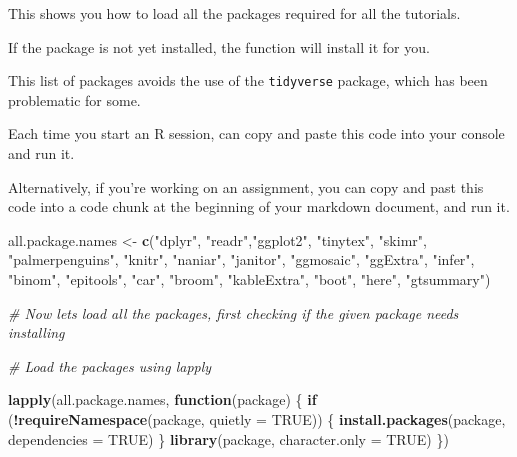 \documentclass[
]{book}
\newenvironment{Shaded}{\begin{snugshade}}{\end{snugshade}}
\newcommand{\AttributeTok}[1]{\textcolor[rgb]{0.13,0.29,0.53}{#1}}
\newcommand{\CommentTok}[1]{\textcolor[rgb]{0.56,0.35,0.01}{\textit{#1}}}
\newcommand{\ConstantTok}[1]{\textcolor[rgb]{0.56,0.35,0.01}{#1}}
\newcommand{\ControlFlowTok}[1]{\textcolor[rgb]{0.13,0.29,0.53}{\textbf{#1}}}
\newcommand{\FunctionTok}[1]{\textcolor[rgb]{0.13,0.29,0.53}{\textbf{#1}}}
\newcommand{\NormalTok}[1]{#1}
\newcommand{\OtherTok}[1]{\textcolor[rgb]{0.56,0.35,0.01}{#1}}
\newcommand{\SpecialCharTok}[1]{\textcolor[rgb]{0.81,0.36,0.00}{\textbf{#1}}}
\newcommand{\StringTok}[1]{\textcolor[rgb]{0.31,0.60,0.02}{#1}}
\begin{document}
This shows you how to load all the packages required for all the tutorials.

If the package is not yet installed, the function will install it for you.

This list of packages avoids the use of the \texttt{tidyverse} package, which has been problematic for some.

Each time you start an R session, can copy and paste this code into your console and run it.

Alternatively, if you're working on an assignment, you can copy and past this code into a code chunk at the beginning of your markdown document, and run it.

\begin{Shaded}
\begin{Highlighting}[]
\NormalTok{all.package.names }\OtherTok{\textless{}{-}} \FunctionTok{c}\NormalTok{(}\StringTok{"dplyr"}\NormalTok{, }\StringTok{"readr"}\NormalTok{,}\StringTok{"ggplot2"}\NormalTok{, }\StringTok{"tinytex"}\NormalTok{, }\StringTok{"skimr"}\NormalTok{, }\StringTok{"palmerpenguins"}\NormalTok{, }\StringTok{"knitr"}\NormalTok{, }\StringTok{"naniar"}\NormalTok{, }\StringTok{"janitor"}\NormalTok{, }\StringTok{"ggmosaic"}\NormalTok{, }\StringTok{"ggExtra"}\NormalTok{, }\StringTok{"infer"}\NormalTok{, }\StringTok{"binom"}\NormalTok{, }\StringTok{"epitools"}\NormalTok{, }\StringTok{"car"}\NormalTok{, }\StringTok{"broom"}\NormalTok{, }\StringTok{"kableExtra"}\NormalTok{, }\StringTok{"boot"}\NormalTok{, }\StringTok{"here"}\NormalTok{, }\StringTok{"gtsummary"}\NormalTok{)}

\CommentTok{\# Now let\textquotesingle{}s load all the packages, first checking if the given package needs installing}

\CommentTok{\# Load the packages using lapply}

\FunctionTok{lapply}\NormalTok{(all.package.names, }\ControlFlowTok{function}\NormalTok{(package) \{}
  \ControlFlowTok{if}\NormalTok{ (}\SpecialCharTok{!}\FunctionTok{requireNamespace}\NormalTok{(package, }\AttributeTok{quietly =} \ConstantTok{TRUE}\NormalTok{)) \{}
    \FunctionTok{install.packages}\NormalTok{(package, }\AttributeTok{dependencies =} \ConstantTok{TRUE}\NormalTok{)}
\NormalTok{  \}}
  \FunctionTok{library}\NormalTok{(package, }\AttributeTok{character.only =} \ConstantTok{TRUE}\NormalTok{)}
\NormalTok{\})}
\end{Highlighting}
\end{Shaded}
\end{document}
